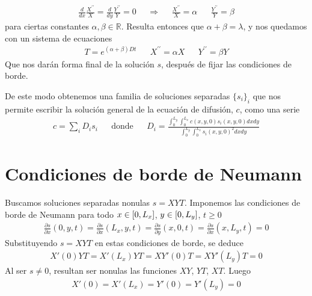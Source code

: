\documentclass{article}
\newcommand{\realNumbers}{\mathbb{R}}
\newcommand{\leftOpenInterval}{\left]}
\newcommand{\rightOpenInterval}{\right[}
\newcommand{\leftClosedInterval}{\left[}
\newcommand{\rightClosedInterval}{\right]}
\newcommand{\interval}[3]{%
  \ifstrequal{#1}{oo}{%
    \leftOpenInterval #2, #3 \rightOpenInterval%
  }{%
    \ifstrequal{#1}{co}{%
      \leftClosedInterval #2, #3 \rightOpenInterval%
    }{%
      \ifstrequal{#1}{oc}{
        \leftOpenInterval #2, #3 \rightClosedInterval%
      }{%
        \ifstrequal{#1}{cc}{
          \leftClosedInterval #2, #3 \rightClosedInterval
        }{%
        }%
      }%
    }%
  }%
}
\begin{document}
  \begin{align}
    \frac{d}{d x} \frac{X^{\prime\prime}}{X} 
    =
    \frac{d}{d y} \frac{Y^{\prime\prime}}{Y}
    =
    0
    &&\Rightarrow
    &&\frac{X^{\prime\prime}}{X} = \alpha
    &&\frac{Y^{\prime\prime}}{Y} = \beta
  \end{align}
  para ciertas constantes \(\alpha, \beta \in \realNumbers\).
  Resulta entonces que \(\alpha + \beta = \lambda\), y nos quedamos con un sistema de ecuaciones
  \begin{align}
    \label{equation:separatedDifussionEquation}
    T = e^{(\alpha + \beta) D t}
    && X^{\prime\prime} = \alpha X
    && Y^{\prime\prime} = \beta Y
  \end{align}
  Que nos darán forma final de la solución \(s\), después de fijar las condiciones de borde.

  De este modo obtenemos una familia de soluciones separadas \(\{s_i\}_i\) que nos permite escribir la solución general de la ecuación de difusión, \(c\), como una serie
  \begin{align}
    c = \sum_i D_i s_i
    &&\text{donde}
    &&D_i = \frac{\int_0^{L_y}\int_0^{L_x} c(x, y, 0) s_i(x, y, 0) d x d y}{\int_0^{L_y}\int_0^{L_x} s_i(x, y, 0)^2 d x d y}
  \end{align}

  \section{Condiciones de borde de Neumann}
  Buscamos soluciones separadas nonulas \(s = X Y T\).
  Imponemos las condiciones de borde de Neumann para todo \(x \in \interval{cc}{0}{L_x}\), \(y \in \interval{cc}{0}{L_y}\), \(t \geq 0\)
  \begin{align}
    \label{equation:NewmannBoundaryConditions}
    \frac{\partial s}{\partial x} (0, y, t)
    =
    \frac{\partial s}{\partial x} (L_x, y, t)
    =
    \frac{\partial s}{\partial y} (x, 0, t)
    =
    \frac{\partial s}{\partial x} (x, L_y, t)
    =
    0
  \end{align}
  Substituyendo \(s = X Y T\) en estas condiciones de borde, se deduce
  \begin{align}
    X'(0) Y T
    =
    X'(L_x) Y T
    =
    X Y'(0) T
    =
    X Y'(L_y) T
    =
    0
  \end{align}
  Al ser \(s \neq 0\), resultan ser nonulas las funciones \(X Y\), \(Y T\), \(X T\).
  Luego
  \begin{align}
    \label{equation:separatedNewmannBoundaryConditions}
    X'(0)
    =
    X'(L_x)
    =
    Y'(0)
    =
    Y'(L_y)
    =
    0
  \end{align}
\end{document}
